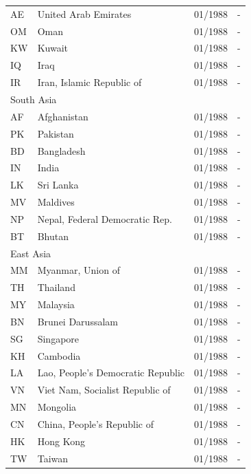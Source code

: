 \begin{footnotesize}
\begin{longtable}{lp{8cm}p{2cm}p{2cm}}
	AE & United Arab Emirates                   & 01/1988 & -  \\
	OM & Oman                                   & 01/1988 & -  \\
	KW & Kuwait                                 & 01/1988 & -  \\
	IQ & Iraq                                   & 01/1988 & -  \\
	IR & Iran, Islamic Republic of              & 01/1988 & -  \\
	\midrule
	\multicolumn{3}{l}{South Asia}  &  \\
	AF & Afghanistan                    & 01/1988 & -  \\
	PK & Pakistan                       & 01/1988 & -  \\
	BD & Bangladesh                     & 01/1988 & -  \\
	IN & India                          & 01/1988 & -  \\
	LK & Sri Lanka                      & 01/1988 & -  \\
	MV & Maldives                       & 01/1988 & -  \\
	NP & Nepal, Federal Democratic Rep. & 01/1988 & -  \\
	BT & Bhutan                         & 01/1988 & -  \\
	\midrule
	\multicolumn{3}{l}{East Asia}  &  \\
	MM & Myanmar, Union of                      & 01/1988 & -  \\
	TH & Thailand                               & 01/1988 & -  \\
	MY & Malaysia                               & 01/1988 & -  \\
	BN & Brunei Darussalam                      & 01/1988 & -  \\
	SG & Singapore                              & 01/1988 & -  \\
	KH & Cambodia                               & 01/1988 & -  \\
	LA & Lao, People's Democratic Republic      & 01/1988 & -  \\
	VN & Viet Nam, Socialist Republic of        & 01/1988 & -  \\
	MN & Mongolia                               & 01/1988 & -  \\
	CN & China, People's Republic of            & 01/1988 & -  \\
	HK & Hong Kong                              & 01/1988 & -  \\
	TW & Taiwan                                 & 01/1988 & -  \\

\end{longtable}
\end{footnotesize}
